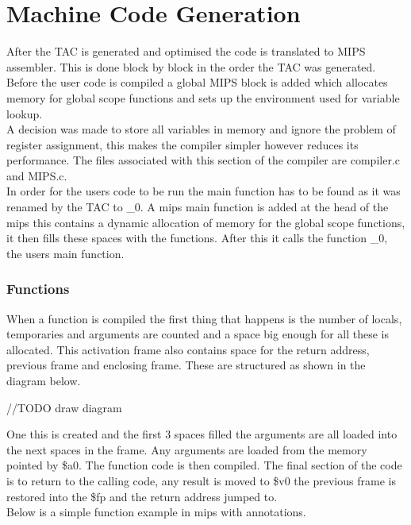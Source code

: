 \documentclass{article}
\begin{document}
\section{Machine Code Generation}

After the TAC is generated and optimised the code is translated to MIPS
assembler. This is done block by block in the order the TAC was generated.
Before the user code is compiled a global MIPS block is added which allocates memory
for global scope functions and sets up the environment used for variable lookup.\\
A decision was made to store all variables in memory and ignore the problem of register
assignment, this makes the compiler simpler however reduces its performance. The files
associated with this section of the compiler are compiler.c and MIPS.c.\\
In order for the users code to be run the main function has to be found as it
was renamed by the TAC to _0. A mips main function is added at the head of the mips
this contains a dynamic allocation of memory for the global scope functions, it then
fills these spaces with the functions. After this it calls the function _0, the users
main function.

\subsubsection{Functions}
When a function is compiled the first thing that happens is the number of locals,
temporaries and arguments are counted and a space big enough for all these is allocated.
This activation frame also contains space for the return address, previous frame
and enclosing frame. These are structured as shown in the diagram below.

//TODO draw diagram

One this is created and the first 3 spaces filled the arguments are all loaded
into the next spaces in the frame. Any arguments are loaded from the memory pointed
by \$a0. The function code is then compiled. The final
section of the code is to return to the calling code, any result is moved to \$v0
the previous frame is restored into the \$fp and the return address jumped to.\\
Below is a simple function example in mips with annotations.
\end{document}

